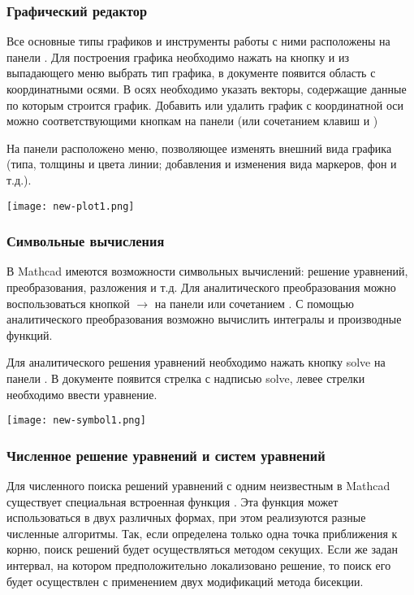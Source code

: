 \subsubsection*{Графический редактор}
Все основные типы графиков и инструменты работы с ними расположены на панели . Для построения графика необходимо нажать на кнопку   и из выпадающего  меню выбрать тип графика, в документе появится область с координатными осями. В осях необходимо указать векторы, содержащие данные по которым строится график. 
Добавить или удалить график с координатной оси можно соответствующими кнопкам на панели  (или сочетанием клавиш \keys{ \shift + \enter} и \keys{\del} )

На панели расположено меню, позволяющее изменять внешний вида графика (типа, толщины и цвета линии; добавления и изменения вида маркеров, фон и т.д.). 
\begin{center}
	\texttt{[image: new-plot1.png]}
\end{center}


\subsubsection*{Символьные вычисления}
В Mathcad имеются возможности символьных вычислений: решение уравнений, преобразования, разложения и т.д. Для аналитического преобразования можно воспользоваться кнопкой $\rightarrow$ на панели   или сочетанием . С помощью аналитического преобразования возможно вычислить интегралы и производные функций.

Для аналитического решения уравнений необходимо нажать кнопку solve  на панели  . В документе появится стрелка с надписью solve, левее стрелки необходимо ввести уравнение.


\begin{center}
	\texttt{[image: new-symbol1.png]}
\end{center}

\subsubsection*{Численное решение уравнений и систем уравнений}
Для численного поиска решений уравнений с одним неизвестным в Mathcad существует специальная встроенная функция . Эта функция может использоваться в двух различных формах, при этом реализуются разные численные алгоритмы. Так, если определена только одна точка приближения к корню, поиск решений будет осуществляться методом секущих. Если же задан интервал, на котором предположительно локализовано решение, то поиск его будет осуществлен с применением двух модификаций метода бисекции.

